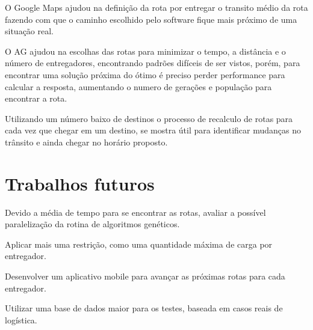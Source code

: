 O Google Maps ajudou na definição da rota por entregar o transito médio da rota fazendo com que o caminho escolhido pelo software fique mais próximo de uma situação real. 

O AG ajudou na escolhas das rotas para minimizar o tempo, a distância e o número de entregadores, encontrando padrões difíceis de ser vistos, porém, para encontrar uma solução próxima do ótimo é preciso perder performance para calcular a resposta, aumentando o numero de gerações e população para encontrar a rota.

Utilizando um número baixo de destinos o processo de recalculo de rotas para cada vez que chegar em um  destino, se mostra útil para identificar mudanças no trânsito e ainda chegar no horário proposto.

\section{Trabalhos futuros}

Devido a média de tempo para se encontrar as rotas, avaliar a possível paralelização da rotina de algoritmos genéticos.

Aplicar mais uma restrição, como uma quantidade máxima de carga por entregador.

Desenvolver um aplicativo mobile para avançar as próximas rotas para cada entregador.

Utilizar uma base de dados maior para os testes, baseada em casos reais de logística.